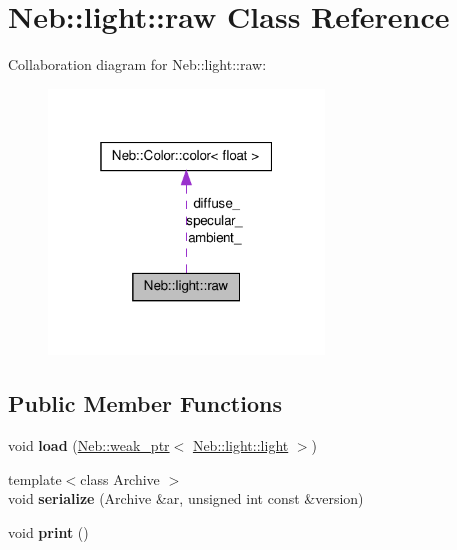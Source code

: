 \hypertarget{classNeb_1_1light_1_1raw}{\section{\-Neb\-:\-:light\-:\-:raw \-Class \-Reference}
\label{classNeb_1_1light_1_1raw}
}


\-Collaboration diagram for \-Neb\-:\-:light\-:\-:raw\-:\nopagebreak
\begin{figure}[H]
\begin{center}
\leavevmode
\includegraphics[width=208pt]{classNeb_1_1light_1_1raw__coll__graph}
\end{center}
\end{figure}
\subsection*{\-Public \-Member \-Functions}
\begin{DoxyCompactItemize}
\item 
\hypertarget{classNeb_1_1light_1_1raw_a6be1b45b24ecfb97f8892c6693614ce4}{void {\bfseries load} (\hyperlink{classNeb_1_1weak__ptr}{\-Neb\-::weak\-\_\-ptr}$<$ \hyperlink{classNeb_1_1light_1_1light}{\-Neb\-::light\-::light} $>$)}\label{classNeb_1_1light_1_1raw_a6be1b45b24ecfb97f8892c6693614ce4}

\item 
\hypertarget{classNeb_1_1light_1_1raw_aa5d3234e06367c7bc8e137574b3fce5e}{{\footnotesize template$<$class Archive $>$ }\\void {\bfseries serialize} (\-Archive \&ar, unsigned int const \&version)}\label{classNeb_1_1light_1_1raw_aa5d3234e06367c7bc8e137574b3fce5e}

\item 
\hypertarget{classNeb_1_1light_1_1raw_a9818fe2fc9498110fa26b408a15df2e7}{void {\bfseries print} ()}\label{classNeb_1_1light_1_1raw_a9818fe2fc9498110fa26b408a15df2e7}

\end{DoxyCompactItemize}
